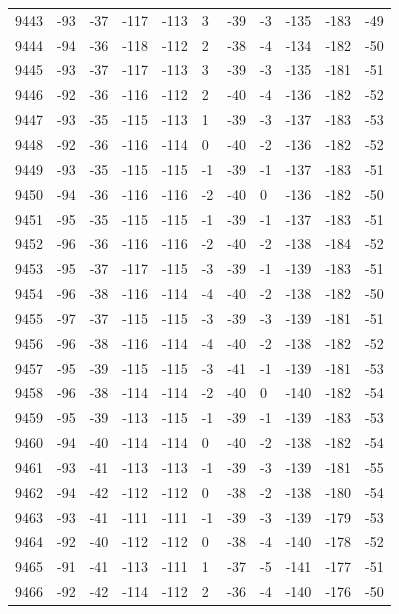 \begin{table}[H]
\begin{tabular}{lllllllllll}
9443 & -93 & -37 & -117 & -113 & 3 & -39 & -3 & -135 & -183 & -49 \\
9444 & -94 & -36 & -118 & -112 & 2 & -38 & -4 & -134 & -182 & -50 \\
9445 & -93 & -37 & -117 & -113 & 3 & -39 & -3 & -135 & -181 & -51 \\
9446 & -92 & -36 & -116 & -112 & 2 & -40 & -4 & -136 & -182 & -52 \\
9447 & -93 & -35 & -115 & -113 & 1 & -39 & -3 & -137 & -183 & -53 \\
9448 & -92 & -36 & -116 & -114 & 0 & -40 & -2 & -136 & -182 & -52 \\
9449 & -93 & -35 & -115 & -115 & -1 & -39 & -1 & -137 & -183 & -51 \\
9450 & -94 & -36 & -116 & -116 & -2 & -40 & 0 & -136 & -182 & -50 \\
9451 & -95 & -35 & -115 & -115 & -1 & -39 & -1 & -137 & -183 & -51 \\
9452 & -96 & -36 & -116 & -116 & -2 & -40 & -2 & -138 & -184 & -52 \\
9453 & -95 & -37 & -117 & -115 & -3 & -39 & -1 & -139 & -183 & -51 \\
9454 & -96 & -38 & -116 & -114 & -4 & -40 & -2 & -138 & -182 & -50 \\
9455 & -97 & -37 & -115 & -115 & -3 & -39 & -3 & -139 & -181 & -51 \\
9456 & -96 & -38 & -116 & -114 & -4 & -40 & -2 & -138 & -182 & -52 \\
9457 & -95 & -39 & -115 & -115 & -3 & -41 & -1 & -139 & -181 & -53 \\
9458 & -96 & -38 & -114 & -114 & -2 & -40 & 0 & -140 & -182 & -54 \\
9459 & -95 & -39 & -113 & -115 & -1 & -39 & -1 & -139 & -183 & -53 \\
9460 & -94 & -40 & -114 & -114 & 0 & -40 & -2 & -138 & -182 & -54 \\
9461 & -93 & -41 & -113 & -113 & -1 & -39 & -3 & -139 & -181 & -55 \\
9462 & -94 & -42 & -112 & -112 & 0 & -38 & -2 & -138 & -180 & -54 \\
9463 & -93 & -41 & -111 & -111 & -1 & -39 & -3 & -139 & -179 & -53 \\
9464 & -92 & -40 & -112 & -112 & 0 & -38 & -4 & -140 & -178 & -52 \\
9465 & -91 & -41 & -113 & -111 & 1 & -37 & -5 & -141 & -177 & -51 \\
9466 & -92 & -42 & -114 & -112 & 2 & -36 & -4 & -140 & -176 & -50 \\

\end{tabular}
\end{table}
